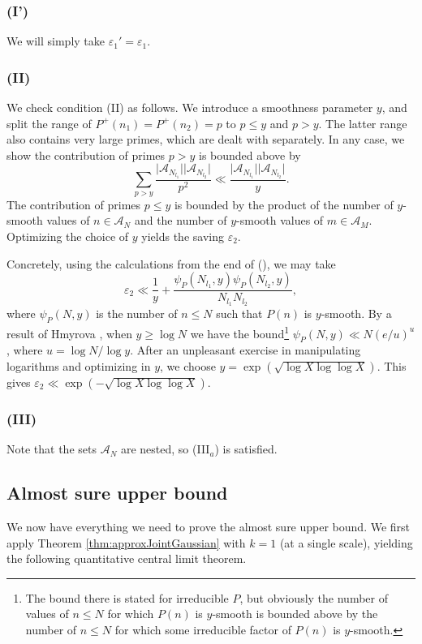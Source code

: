 \documentclass[11pt]{tran-l}
\theoremstyle{definition}
\theoremstyle{remark}
\numberwithin{equation}{section}
\begin{document}
\subsubsection*{(I')} We will simply take $\varepsilon_1' =\varepsilon_1$.  

\subsubsection*{(II)} 
    We check condition (II) as follows. We introduce a smoothness parameter $y$, and split the range of $P^+(n_1) = P^+(n_2)=p$ to $p\leq y$ and $p>y$. The latter range also contains very large primes, which are dealt with separately. In any case, we show the contribution of primes $p>y$ is bounded above by 
    \begin{equation*}
\sum_{p>y}\frac{\lvert\mathcal A_{N_{l_1}}\rvert\lvert\mathcal A_{N_{l_2}}\rvert}{p^2}\ll \frac{\lvert \mathcal A_{N_{l_1}}\rvert\lvert\mathcal A_{N_{l_2}}\rvert}{y}.
    \end{equation*}
    The contribution of primes $p\leq y$ is bounded by the product of the number of $y$-smooth values of $n\in\mathcal A_N$ and the number of $y$-smooth values of $m\in\mathcal A_M$. Optimizing the choice of $y$ yields the saving $\varepsilon_2$. 
    
Concretely, using the calculations from the end of \cite[Section 4]{ChinisShala2025} (\cite[Section 2]{KlurmanShkredovXu2023}), we may take 
$$\varepsilon_2 \ll \frac{1}{y} + \frac{\psi_P(N_{l_1}, y)\psi_P(N_{l_2}, y)}{N_{l_1}N_{l_2}},$$ where $\psi_P(N, y)$ is the number of $n\leq N$ such that $P(n)$ is $y$-smooth. By a result of Hmyrova \cite{Hmyrova1966}, when $y\geq\log N$ we have the bound\footnote{The bound there is stated for irreducible $P$, but obviously the number of values of $n\leq N$ for which $P(n)$ is $y$-smooth is bounded above by the number of $n\leq N$ for which some irreducible factor of $P(n)$ is $y$-smooth.} $\psi_P(N, y)\ll N(e/u)^u$, where $u=\log N/\log y$. After an unpleasant exercise in manipulating logarithms and optimizing in $y$, 
we choose $y  = \exp\left(\sqrt{\log X\log\log X}\right)$. This gives 
$\varepsilon_2 \ll \exp(-\sqrt{\log X\log\log X})$. 

\subsubsection*{(III)} Note that the sets $\mathcal A_N$ are nested, so (III$_a$) is satisfied. 

\subsection{Almost sure upper bound} We now have everything we need to prove the almost sure upper bound. We first apply Theorem \ref{thm:approxJointGaussian} with $k=1$ (at a single scale), yielding the following quantitative central limit theorem. 
\end{document}
